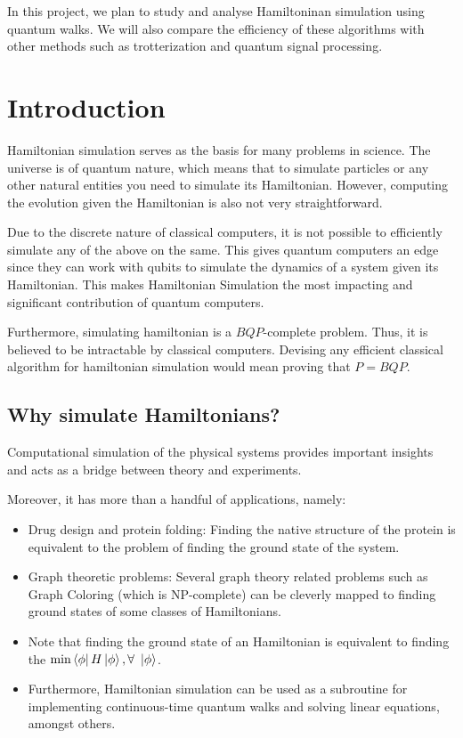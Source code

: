 \documentclass[
10pt, %
a4paper, %
oneside, %
headinclude,footinclude, %
BCOR5mm, %
]{scrartcl}
\begin{document}
In this project, we plan to study and analyse Hamiltoninan simulation using quantum walks. We will also compare the efficiency of these algorithms with other methods such as trotterization and quantum signal processing.


\section{Introduction}
Hamiltonian simulation serves as the basis for many problems in science. The universe is of quantum nature, which means that to simulate particles or any other natural entities you need to simulate its Hamiltonian. However, computing the evolution given the Hamiltonian is also not very straightforward.\newline

Due to the discrete nature of classical computers, it is not possible to efficiently simulate any of the above on the same. This gives quantum computers an edge since they can work with qubits to simulate the dynamics of a system given its Hamiltonian. This makes Hamiltonian Simulation the most impacting and significant contribution of quantum computers.\newline

Furthermore, simulating hamiltonian is a $BQP$-complete problem. Thus, it is believed to be intractable by classical computers. Devising any efficient classical algorithm for hamiltonian simulation would mean proving that $P = BQP$.

\subsection{Why simulate Hamiltonians?}
Computational simulation of the physical systems provides important insights and acts as a bridge between theory and experiments.\newline

Moreover, it has more than a handful of applications, namely:
\begin{itemize}
    \item Drug design and protein folding: Finding the native structure of the protein is equivalent to the problem of finding the ground state of the system.
    \item Graph theoretic problems: Several graph theory related problems such as Graph Coloring (which is NP-complete) can be cleverly mapped to finding ground states of some classes of Hamiltonians.
    \item Note that finding the ground state of an Hamiltonian is equivalent to finding the $\min \bra{\phi}H\ket{\phi}, \forall\ \ket{\phi}$.
    \item Furthermore, Hamiltonian simulation can be used as a subroutine for implementing continuous-time quantum walks and solving linear equations, amongst others.
\end{itemize}
\end{document}
